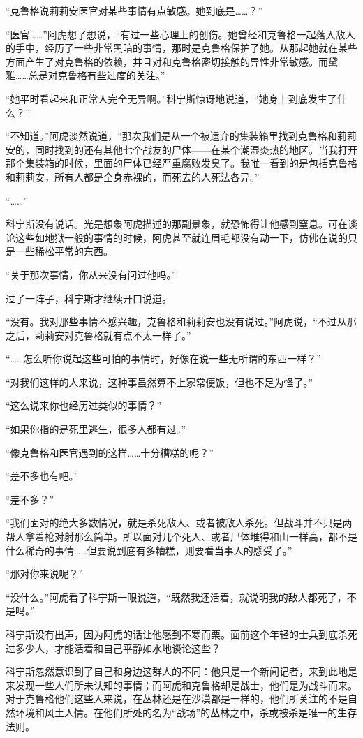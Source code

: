 “克鲁格说莉莉安医官对某些事情有点敏感。她到底是……？”

“医官……”阿虎想了想说，“有过一些心理上的创伤。她曾经和克鲁格一起落入敌人的手中，经历了一些非常黑暗的事情，那时是克鲁格保护了她。从那起她就在某些方面产生了对克鲁格的依赖，并且对和克鲁格密切接触的异性非常敏感。而黛雅……总是对克鲁格有些过度的关注。”

“她平时看起来和正常人完全无异啊。”科宁斯惊讶地说道，“她身上到底发生了什么？”

“不知道。”阿虎淡然说道，“那次我们是从一个被遗弃的集装箱里找到克鲁格和莉莉安的，同时找到的还有其他七个战友的尸体——在某个潮湿炎热的地区。当我打开那个集装箱的时候，里面的尸体已经严重腐败发臭了。我唯一看到的是包括克鲁格和莉莉安，所有人都是全身赤裸的，而死去的人死法各异。”

“……”

科宁斯没有说话。光是想象阿虎描述的那副景象，就恐怖得让他感到窒息。可在谈论这些如地狱一般的事情的时候，阿虎甚至就连眉毛都没有动一下，仿佛在说的只是一些稀松平常的东西。

“关于那次事情，你从来没有问过他吗。”

过了一阵子，科宁斯才继续开口说道。

“没有。我对那些事情不感兴趣，克鲁格和莉莉安也没有说过。”阿虎说，“不过从那之后，莉莉安对克鲁格就有点不太一样了。”

“……怎么听你说起这些可怕的事情时，好像在说一些无所谓的东西一样？”

“对我们这样的人来说，这种事虽然算不上家常便饭，但也不足为怪了。”

“这么说来你也经历过类似的事情？”

“如果你指的是死里逃生，很多人都有过。”

“像克鲁格和医官遇到的这样……十分糟糕的呢？”

“差不多也有吧。”

“差不多？”

“我们面对的绝大多数情况，就是杀死敌人、或者被敌人杀死。但战斗并不只是两帮人拿着枪对射那么简单。所以面对几个死人、或者尸体堆得和山一样高，都不是什么稀奇的事情……但要说到底有多糟糕，则要看当事人的感受了。”

“那对你来说呢？”

“没什么。”阿虎看了科宁斯一眼说道，“既然我还活着，就说明我的敌人都死了，不是吗。”

科宁斯没有出声，因为阿虎的话让他感到不寒而栗。面前这个年轻的士兵到底杀死过多少人，才能活着和自己平静如水地谈论这些？

科宁斯忽然意识到了自己和身边这群人的不同：他只是一个新闻记者，来到此地是来发现一些人们所未认知的事情；而阿虎和克鲁格却是战士，他们是为战斗而来。对于克鲁格他们这些人来说，在丛林还是在沙漠都是一样的，他们所关注的不是自然环境和风土人情。在他们所处的名为“战场”的丛林之中，杀或被杀是唯一的生存法则。

